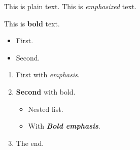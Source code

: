 \begin{para}
This is plain text.
This is \emph{emphasized} text.
\end{para}

\begin{para}
This is \textbf{bold} text.
\end{para}


\begin{itemize}
\item{First.}
\item{Second.}
\end{itemize}


\begin{enumerate}
\item{First with \emph{emphasis}.}
\item{\textbf{Second} with bold.}
\begin{itemize}
\item{Nested list.}
\item{With \emph{\textbf{Bold emphasis}}.}
\end{itemize}
\item{The end.}
\end{enumerate}

